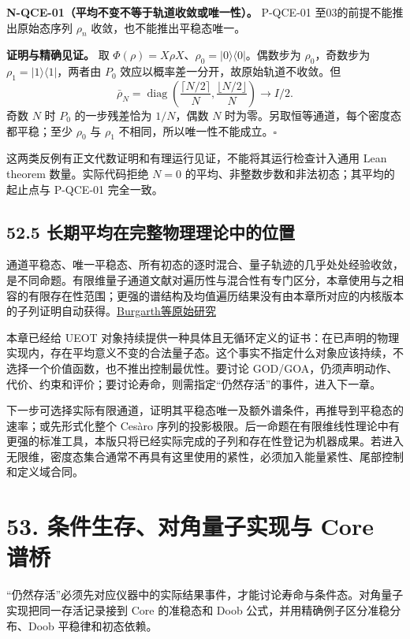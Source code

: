 \documentclass[
  11pt,
  oneside]{book}
\begin{document}
\protect\hypertarget{n-qce-01}{}{}

\textbf{N-QCE-01（平均不变不等于轨道收敛或唯一性）。} P-QCE-01
至03的前提不能推出原始态序列 \(\rho_n\) 收敛，也不能推出平稳态唯一。

\textbf{证明与精确见证。} 取
\(\Phi(\rho)=X\rho X\)、\(\rho_0=|0\rangle\langle0|\)。偶数步为
\(\rho_0\)，奇数步为 \(\rho_1=|1\rangle\langle1|\)，两者由 \(P_0\)
效应以概率差一分开，故原始轨道不收敛。但 \[
\bar\rho_N=\operatorname{diag}\left(\frac{\lceil N/2\rceil}{N},
\frac{\lfloor N/2\rfloor}{N}\right)\longrightarrow I/2.
\] 奇数 \(N\) 时 \(P_0\) 的一步残差恰为 \(1/N\)，偶数 \(N\)
时为零。另取恒等通道，每个密度态都平稳；至少 \(\rho_0\) 与 \(\rho_1\)
不相同，所以唯一性不能成立。\(\square\)

这两类反例有正文代数证明和有理运行见证，不能将其运行检查计入通用 Lean
theorem 数量。实际代码拒绝 \(N=0\)
的平均、非整数步数和非法初态；其平均的起止点与 P-QCE-01 完全一致。

\section{52.5 长期平均在完整物理理论中的位置}

通道平稳态、唯一平稳态、所有初态的逐时混合、量子轨迹的几乎处处经验收敛，是不同命题。有限维量子通道文献对遍历性与混合性有专门区分，本章使用与之相容的有限存在性范围；更强的谱结构及均值遍历结果没有由本章所对应的内核版本的子列证明自动获得。\href{https://arxiv.org/abs/1210.5625}{Burgarth等原始研究}

本章已经给 UEOT
对象持续提供一种具体且无循环定义的证书：在已声明的物理实现内，存在平均意义不变的合法量子态。这个事实不指定什么对象应该持续，不选择一个价值函数，也不推出控制最优性。要讨论
GOD/GOA，仍须声明动作、代价、约束和评价；要讨论寿命，则需指定``仍然存活''的事件，进入下一章。

下一步可选择实际有限通道，证明其平稳态唯一及额外谱条件，再推导到平稳态的速率；或先形式化整个
Cesàro
序列的投影极限。后一命题在有限维线性理论中有更强的标准工具，本版只将已经实际完成的子列和存在性登记为机器成果。若进入无限维，密度态集合通常不再具有这里使用的紧性，必须加入能量紧性、尾部控制和定义域合同。

\chapter{53. 条件生存、对角量子实现与 Core 谱桥}\label{ch-53}\hypertarget{ch-53}{}

``仍然存活''必须先对应仪器中的实际结果事件，才能讨论寿命与条件态。对角量子实现把同一存活记录接到
Core 的准稳态和 Doob 公式，并用精确例子区分准稳分布、Doob
平稳律和初态依赖。
\end{document}
